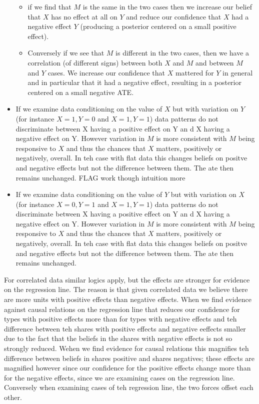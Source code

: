 \documentclass[
  12pt,
]{book}
\providecommand{\tightlist}{%
  \setlength{\itemsep}{0pt}\setlength{\parskip}{0pt}}
\begin{document}
\begin{itemize}
  \begin{itemize}
  \tightlist
  \item
    if we find that \(M\) is the same in the two cases then we increase our belief that \(X\) has no effect at all on \(Y\) and reduce our confidence that \(X\) had a negative effect \(Y\) (producing a posterior centered on a small positive effect).
  \item
    Conversely if we see that \(M\) is different in the two cases, then we have a correlation (of different signs) between both \(X\) and \(M\) and between \(M\) and \(Y\) cases. We increase our confidence that \(X\) mattered for \(Y\) in general and in particular that it had a negative effect, resulting in a posterior centered on a small negative ATE.
  \end{itemize}
\item
  If we examine data conditioning on the value of \(X\) but with variation on \(Y\) (for instance \(X=1, Y=0\) and \(X=1, Y=1\))
  data patterns do not discriminate between X having a positive effect on Y an d X having a negative effect on Y. However variation in \(M\) is more consistent with \(M\) being responsive to \(X\) and thus the chances that \(X\) matters, positively or negatively, overall. In teh case with flat data this changes beliefs on positve and negative effects but not the difference between them. The ate then remains unchanged. FLAG work though intuition more
\item
  If we examine data conditioning on the value of \(Y\) but with variation on \(X\) (for instance \(X=0, Y=1\) and \(X=1, Y=1\))
  data patterns do not discriminate between X having a positive effect on Y an d X having a negative effect on Y. However variation in \(M\) is more consistent with \(M\) being responsive to \(X\) and thus the chances that \(X\) matters, positively or negatively, overall. In teh case with flat data this changes beliefs on positve and negative effects but not the difference between them. The ate then remains unchanged.
\end{itemize}

For correlated data similar logics apply, but the effects are stronger for evidence on the regression line. The reason is that given correlated data we believe there are more units with positive effects than negative effects. When we find evidence against causal relations on the regression line that reduces our confidence for types with positive effects more than for types with negative effects and teh difference between teh shares with positive effects and negative eeffects smaller due to the fact that the beliefs in the shares with negative effects is not so strongly reduced. Wehen we find evidence for causal relations this magnifies teh difference between beliefs in shares positive and shares negatives; these effects are magnified however since our confidence for the positive effects change more than for the negative effects, since we are examining cases on the regression line. Conversely when examining cases of teh regression line, the two forces offset each other.
\end{document}

